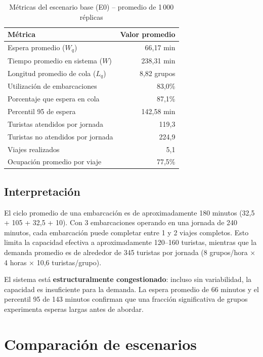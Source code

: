 \documentclass[12pt,a4paper]{article}
\begin{document}
\begin{table}[H]
  \centering
  \caption{Métricas del escenario base (E0) -- promedio de 1\,000 réplicas}
  \begin{tabular}{@{}lr@{}}
    \toprule
    Métrica & Valor promedio \\
    \midrule
    Espera promedio ($W_q$)            & 66,17 min \\
    Tiempo promedio en sistema ($W$)   & 238,31 min \\
    Longitud promedio de cola ($L_q$)  & 8,82 grupos \\
    Utilización de embarcaciones       & 83,0\% \\
    Porcentaje que espera en cola      & 87,1\% \\
    Percentil 95 de espera             & 142,58 min \\
    Turistas atendidos por jornada     & 119,3 \\
    Turistas no atendidos por jornada  & 224,9 \\
    Viajes realizados                  & 5,1 \\
    Ocupación promedio por viaje       & 77,5\% \\
    \bottomrule
  \end{tabular}
\end{table}

\subsection{Interpretación}

El ciclo promedio de una embarcación es de aproximadamente 180 minutos
(32,5 + 105 + 32,5 + 10). Con 3 embarcaciones operando en una jornada de
240 minutos, cada embarcación puede completar entre 1 y 2 viajes completos.
Esto limita la capacidad efectiva a aproximadamente 120--160 turistas,
mientras que la demanda promedio es de alrededor de 345 turistas por
jornada (8 grupos/hora × 4 horas × 10,6 turistas/grupo).

El sistema está \textbf{estructuralmente congestionado}: incluso sin
variabilidad, la capacidad es insuficiente para la demanda. La espera
promedio de 66 minutos y el percentil 95 de 143 minutos confirman que una
fracción significativa de grupos experimenta esperas largas antes de
abordar.

\section{Comparación de escenarios}
\end{document}
